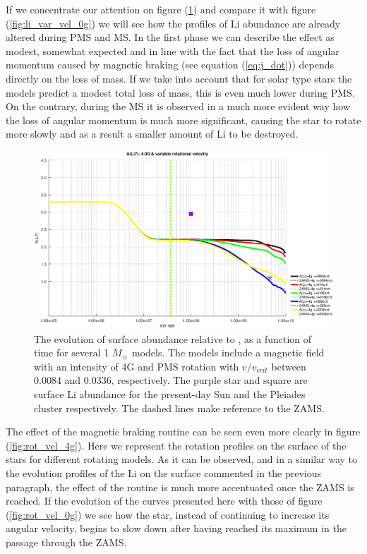 \documentclass[fleqn,usenatbib]{mnras}
\begin{document}
If we concentrate our attention on figure (\ref{fig:li_var_vel_4_0g}) and compare it with figure (\ref{fig:li_var_vel_0g}) we will see how the profiles of Li abundance are already altered during PMS and MS. In the first phase we can describe the effect as modest, somewhat expected and in line with the fact that the loss of angular momentum caused by magnetic braking (see equation (\ref{eq:j_dot})) depends directly on the loss of mass. If we take into account that for solar type stars the models predict a modest total loss of mass, this is even much lower during PMS. On the contrary, during the MS it is observed in a much more evident way how the loss of angular momentum is much more significant, causing the star to rotate more slowly and as a result a smaller amount of Li to be destroyed.\par

\begin{figure}
	\includegraphics[width=\columnwidth]{figures/li_var_vel_4_0g.eps}
    \caption{The evolution of surface  abundance relative to , as a function of time for several 1 $M_{\sun}$ models. The models include a magnetic field with an intensity of 4G and PMS rotation with $v/v_{crit}$ between 0.0084 and 0.0336, respectively. The purple star and square are surface Li abundance for the present-day Sun \citep{Asplund2009} and the Pleiades cluster \citep{Sestito2005} respectively. The dashed lines make reference to the ZAMS.}
    \label{fig:li_var_vel_4_0g}
\end{figure}

The effect of the magnetic braking routine can be seen even more clearly in figure (\ref{fig:rot_vel_4g}). Here we represent the rotation profiles on the surface of the stars for different rotating models. As it can be observed, and in a similar way to the evolution profiles of the Li on the surface commented in the previous paragraph, the effect of the routine is much more accentuated once the ZAMS is reached. If the evolution of the curves presented here with those of figure (\ref{fig:rot_vel_0g}) we see how the star, instead of continuing to increase its angular velocity, begins to slow down after having reached its maximum in the passage through the ZAMS.\par
\end{document}
